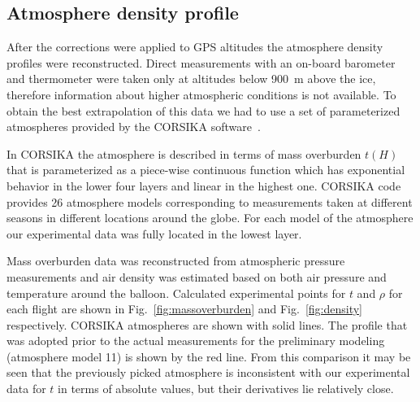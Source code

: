 \documentclass[universe,article,submit,moreauthors,pdftex]{Definitions/mdpi}
\begin{document}
\subsection{Atmosphere density profile}
\label{sect:atmosphere-profile}

After the corrections were applied to GPS altitudes the atmosphere density profiles were reconstructed. Direct measurements with an on-board barometer and thermometer were taken only at altitudes below 900~m above the ice, therefore information about higher atmospheric conditions is not available. To obtain the best extrapolation of this data we had to use a set of parameterized atmospheres provided by the CORSIKA software~\cite{hec98}.

In CORSIKA the atmosphere is described in terms of mass overburden $t(H)$ that is parameterized as a piece-wise continuous function which has exponential behavior in the lower four layers and linear in the highest one. CORSIKA code provides 26 atmosphere models corresponding to measurements taken at different seasons in different locations around the globe. For each model of the atmosphere our experimental data was fully located in the lowest layer.





Mass overburden data was reconstructed from atmospheric pressure measurements and air density was estimated based on both air pressure and temperature around the balloon. Calculated experimental points for $t$ and $\rho$ for each flight are shown in Fig.~\ref{fig:massoverburden} and Fig.~\ref{fig:density} respectively. CORSIKA atmospheres are shown with solid lines. The profile that was adopted prior to the actual measurements for the preliminary modeling (atmosphere model 11) is shown by the red line. From this comparison it may be seen that the previously picked atmosphere is inconsistent with our experimental data for $t$ in terms of absolute values, but their derivatives lie relatively close. %
\end{document}
